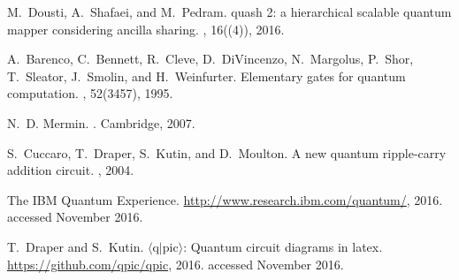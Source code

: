 \documentclass[USenglish,12pt,fleqn]{article} %
\begin{document}
\begin{thebibliography}{10}
M.~Dousti, A.~Shafaei, and M.~Pedram.
quash 2: a hierarchical scalable quantum mapper considering
  ancilla sharing.
, 16((4)), 2016.

A.~Barenco, C.~Bennett, R.~Cleve, D.~DiVincenzo, N.~Margolus, P.~Shor,
  T.~Sleator, J.~Smolin, and H.~Weinfurter.
\newblock Elementary gates for quantum computation.
, 52(3457), 1995.

N.~D. Mermin.
.
\newblock Cambridge, 2007.

S.~Cuccaro, T.~Draper, S.~Kutin, and D.~Moulton.
\newblock A new quantum ripple-carry addition circuit.
, 2004.

The {IBM} {Q}uantum {E}xperience.
\newblock \url{http://www.research.ibm.com/quantum/}, 2016.
\newblock accessed November 2016.

T.~Draper and S.~Kutin.
\newblock $\langle\mathrm{q}|\mathrm{pic}\rangle$: Quantum circuit diagrams in
  latex.
\newblock \url{https://github.com/qpic/qpic}, 2016.
\newblock accessed November 2016.

\end{thebibliography}
\end{document}
